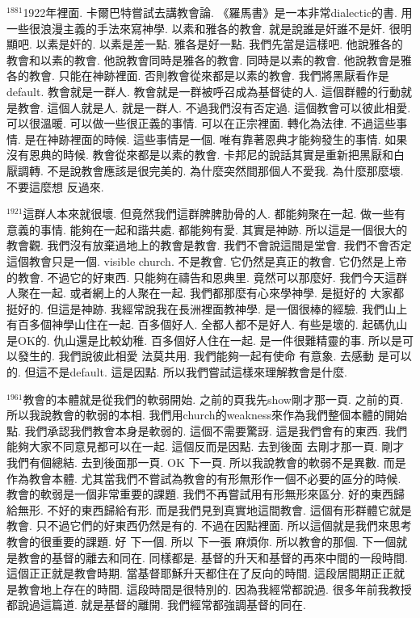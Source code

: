 \documentclass{book}
\begin{document}
$^{1881}$1922年裡面.
卡爾巴特嘗試去講教會論.
《羅馬書》是一本非常dialectic的書.
用一些很浪漫主義的手法來寫神學.
以素和雅各的教會.
就是說誰是奸誰不是奸.
很明顯吧.
以素是奸的.
以素是差一點.
雅各是好一點.
我們先當是這樣吧.
他說雅各的教會和以素的教會.
他說教會同時是雅各的教會.
同時是以素的教會.
他說教會是雅各的教會.
只能在神跡裡面.
否則教會從來都是以素的教會.
我們將黑厭看作是default.
教會就是一群人.
教會就是一群被呼召成為基督徒的人.
這個群體的行動就是教會.
這個人就是人.
就是一群人.
不過我們沒有否定過.
這個教會可以彼此相愛.
可以很溫暖.
可以做一些很正義的事情.
可以在正宗裡面.
轉化為法律.
不過這些事情.
是在神跡裡面的時候.
這些事情是一個.
唯有靠著恩典才能夠發生的事情.
如果沒有恩典的時候.
教會從來都是以素的教會.
卡邦尼的說話其實是重新把黑厭和白厭調轉.
不是說教會應該是很完美的.
為什麼突然間那個人不愛我.
為什麼那麼壞.
不要這麼想 反過來.

$^{1921}$這群人本來就很壞.
但竟然我們這群脾脾肋骨的人.
都能夠聚在一起.
做一些有意義的事情.
能夠在一起和諧共處.
都能夠有愛.
其實是神跡.
所以這是一個很大的教會觀.
我們沒有放棄過地上的教會是教會.
我們不會說這間是堂會.
我們不會否定這個教會只是一個.
visible church.
不是教會.
它仍然是真正的教會.
它仍然是上帝的教會.
不過它的好東西.
只能夠在禱告和恩典里.
竟然可以那麼好.
我們今天這群人聚在一起.
或者網上的人聚在一起.
我們都那麼有心來學神學.
是挺好的 大家都挺好的.
但這是神跡.
我經常說我在長洲裡面教神學.
是一個很棒的經驗.
我們山上有百多個神學山住在一起.
百多個好人.
全都人都不是好人.
有些是壞的.
起碼仇山是OK的.
仇山還是比較幼稚.
百多個好人住在一起.
是一件很難精靈的事.
所以是可以發生的.
我們說彼此相愛 法莫共用.
我們能夠一起有使命 有意象.
去感動 是可以的.
但這不是default.
這是因點.
所以我們嘗試這樣來理解教會是什麼.

$^{1961}$教會的本體就是從我們的軟弱開始.
之前的頁我先show剛才那一頁.
之前的頁.
所以我說教會的軟弱的本相.
我們用church的weakness來作為我們整個本體的開始點.
我們承認我們教會本身是軟弱的.
這個不需要驚訝.
這是我們會有的東西.
我們能夠大家不同意見都可以在一起.
這個反而是因點.
去到後面 去剛才那一頁.
剛才我們有個總結.
去到後面那一頁.
OK 下一頁.
所以我說教會的軟弱不是異數.
而是作為教會本體.
尤其當我們不嘗試為教會的有形無形作一個不必要的區分的時候.
教會的軟弱是一個非常重要的課題.
我們不再嘗試用有形無形來區分.
好的東西歸給無形.
不好的東西歸給有形.
而是我們見到真實地這間教會.
這個有形群體它就是教會.
只不過它們的好東西仍然是有的.
不過在因點裡面.
所以這個就是我們來思考教會的很重要的課題.
好 下一個.
所以 下一張 麻煩你.
所以教會的那個.
下一個就是教會的基督的離去和同在.
同樣都是.
基督的升天和基督的再來中間的一段時間.
這個正正就是教會時期.
當基督耶穌升天都住在了反向的時間.
這段居間期正正就是教會地上存在的時間.
這段時間是很特別的.
因為我經常都說過.
很多年前我教授都說過這篇道.
就是基督的離開.
我們經常都強調基督的同在.
\end{document}
